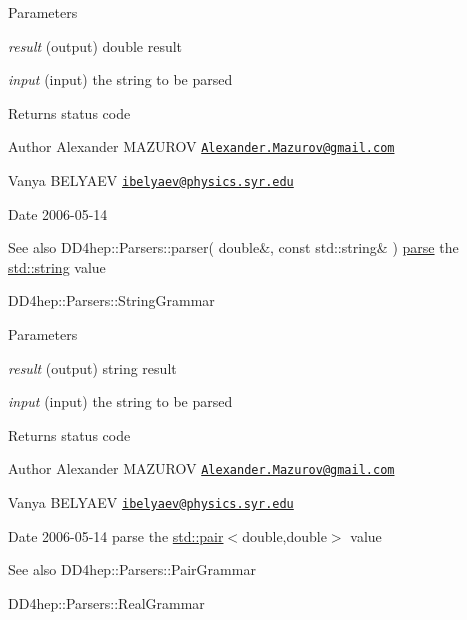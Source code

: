 \begin{DoxyParams}{Parameters}
\item[{\em result}](output) double result \item[{\em input}](input) the string to be parsed \end{DoxyParams}
\begin{DoxyReturn}{Returns}
status code
\end{DoxyReturn}
\begin{DoxyAuthor}{Author}
Alexander MAZUROV \href{mailto:Alexander.Mazurov@gmail.com}{\tt Alexander.Mazurov@gmail.com} 

Vanya BELYAEV \href{mailto:ibelyaev@physics.syr.edu}{\tt ibelyaev@physics.syr.edu} 
\end{DoxyAuthor}
\begin{DoxyDate}{Date}
2006-\/05-\/14 
\end{DoxyDate}
\begin{DoxySeeAlso}{See also}
DD4hep::Parsers::parser( double\&, const std::string\& ) \hyperlink{namespace_d_d4hep_1_1_parsers_a49cf20eb52b8e48550d6e3f74b94069e}{parse} the {\ttfamily \hyperlink{classstd_1_1string}{std::string}} value

DD4hep::Parsers::StringGrammar 
\end{DoxySeeAlso}

\begin{DoxyParams}{Parameters}
\item[{\em result}](output) string result \item[{\em input}](input) the string to be parsed \end{DoxyParams}
\begin{DoxyReturn}{Returns}
status code
\end{DoxyReturn}
\begin{DoxyAuthor}{Author}
Alexander MAZUROV \href{mailto:Alexander.Mazurov@gmail.com}{\tt Alexander.Mazurov@gmail.com} 

Vanya BELYAEV \href{mailto:ibelyaev@physics.syr.edu}{\tt ibelyaev@physics.syr.edu} 
\end{DoxyAuthor}
\begin{DoxyDate}{Date}
2006-\/05-\/14 parse the {\ttfamily \hyperlink{classstd_1_1pair}{std::pair}$<$double,double$>$} value 
\end{DoxyDate}
\begin{DoxySeeAlso}{See also}
DD4hep::Parsers::PairGrammar 

DD4hep::Parsers::RealGrammar 
\end{DoxySeeAlso}

